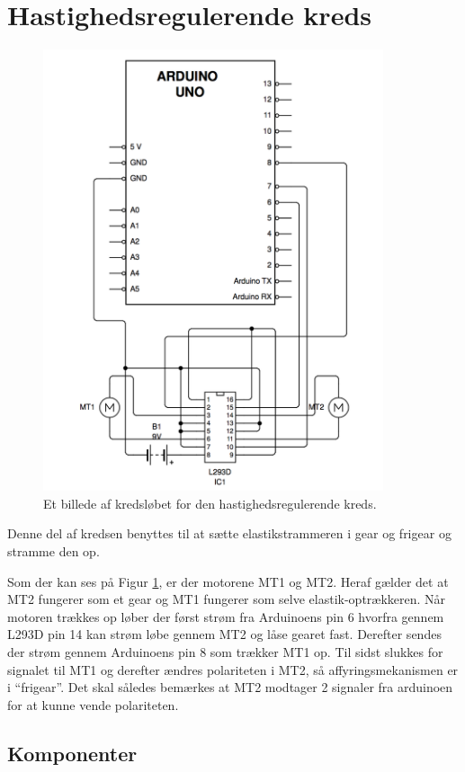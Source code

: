 \section{Hastighedsregulerende kreds}
\begin{figure}[H]	\label{kreds:hastighed}
	\centering
    \includegraphics[width=10cm]{figures/CIRCUITS/dcmotorFinal.png}
	\caption{Et billede af kredsløbet for den hastighedsregulerende kreds.}
\end{figure}
Denne del af kredsen benyttes til at sætte elastikstrammeren i gear og frigear og stramme den op.

Som der kan ses på Figur \ref{kreds:hastighed}, er der motorene MT1 og MT2. Heraf gælder det at MT2 fungerer som et gear og MT1 fungerer som selve elastik-optrækkeren. Når motoren trækkes op løber der først strøm fra Arduinoens pin 6  hvorfra gennem L293D pin 14 kan strøm løbe gennem MT2 og låse gearet fast. Derefter sendes der strøm gennem Arduinoens pin 8 som trækker MT1 op. 
Til sidst slukkes for signalet til MT1 og derefter ændres polariteten i MT2, så affyringsmekanismen er i ``frigear''. Det skal således bemærkes at MT2 modtager 2 signaler fra arduinoen for at kunne vende polariteten.

\subsection{Komponenter}
